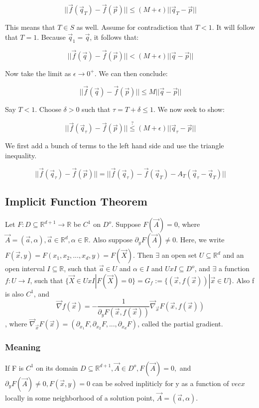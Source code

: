 \documentclass[11 pt, twoside]{article}
\begin{document}
$$ ||\vec{f}(\vec{q}_T) - \vec{f}(\vec{p})|| \leq (M + \epsilon) ||\vec{q}_T
- \vec{p}||$$

This means that $T \in S$ as well. Assume for contradiction that $T < 1$. It
will follow that $T = 1$. Because $\vec{q}_1 = \vec{q}$, it follows that:

$$ ||\vec{f}(\vec{q}) - \vec{f}(\vec{p})|| < (M + \epsilon) ||\vec{q} - \vec{p}||$$

Now take the limit as $\epsilon \to 0^+$. We can then conclude:

$$ ||\vec{f}(\vec{q}) - \vec{f}(\vec{p})|| \leq M ||\vec{q} - \vec{p}||$$

Say $T < 1$. Choose $\delta > 0$ such that $\tau = T + \delta \leq 1$. We now
seek to show:

$$ ||\vec{f}(\vec{q}_{\tau}) - \vec{f}(\vec{p})|| \overset{?}{\leq} (M +
\epsilon) ||\vec{q}_{\tau} - \vec{p}||$$

We first add a bunch of terms to the left hand side and use the triangle
inequality.

$$ ||\vec{f}(\vec{q}_{\tau}) - \vec{f}(\vec{p})|| =
||\vec{f}(\vec{q}_{\tau}) - \vec{f}(\vec{q}_T) - A_T(\vec{q}_{\tau} -
\vec{q}_T)||$$


\subsection{Implicit Function Theorem}
Let $F: D \subseteq \mathbb{R}^{d+1} \to \mathbb{R}$ be $C^1$ on $D^o$. Suppose $F(\vec{A}) = 0$, where $\vec{A} = (\vec{a}, \alpha), \vec{a} \in \mathbb{R}^d, \alpha \in \mathbb{R}$. Also suppose $\partial_yF(\vec{A}) \neq 0$. Here, we write $F(\vec{x}, y) = F(x_1, x_2, ..., x_d, y) = F(\vec{X})$. Then $\exists$ an open set $U \subseteq \mathbb{R}^d$ and an open interval $I \subseteq \mathbb{R}$, such that $\vec{a} \in U$ and $\alpha \in I$ and $U x I \subseteq D^o$, and $\exists$ a function $f: U \to I$, such that $\{\vec{X} \in U x I|F(\vec{X}) = 0\} = G_f := \{(\vec{x}, f(\vec{x}))|\vec{x} \in U\}$. 
Also f is also $C^1$, and $$\vec{\nabla}f(\vec{x}) = -\frac{1}{\partial_yF(\vec{x}, f(\vec{x}))}\vec{\nabla}_{\vec{x}}F(\vec{x}, f(\vec{x}))$$, where $\vec{\nabla}_{\vec{x}}F(\vec{x}) = (\partial_{x_1}F, \partial_{x_2}F, ..., \partial_{x_d}F)$, called the partial gradient.
\subsubsection{Meaning}
If F is $C^1$ on its domain $D \subseteq \mathbb{R}^{d+1}, \vec{A} \in D^o, F(\vec{A}) = 0,$ and $\partial_yF(\vec{A}) \neq 0, F(\vec{x}, y) = 0$ can be solved inpliticly for y as a function of $vec{x}$ locally in some neighborhood of a solution point, $\vec{A} = (\vec{a}, \alpha)$.
\end{document}
